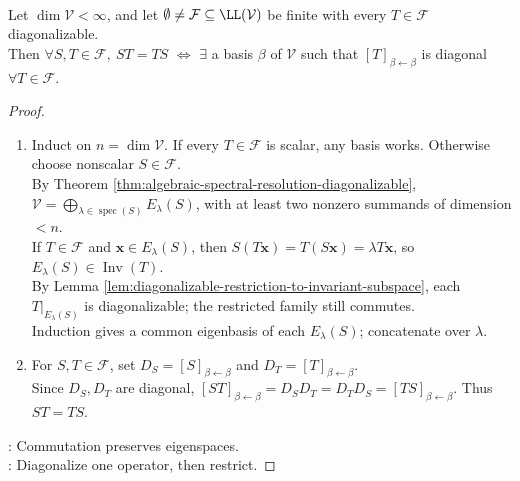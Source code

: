 \begin{theorem} \label{thm:simultaneous-diagonalization-commuting-diagonalizable-family} \\
Let $\dim\mathcal{V}<\infty$, and let $\emptyset\neq\mathcal{F}\subseteq\LL(\mathcal{V})$ be finite with every $T\in\mathcal{F}$ diagonalizable.\\
Then $\forall S,T\in\mathcal{F},\ ST=TS$ $\Longleftrightarrow$ $\exists$ a basis $\beta$ of $\mathcal{V}$ such that $[T]_{\beta\leftarrow\beta}$ is diagonal $\forall T\in\mathcal{F}$.
\begin{proof}
\begin{enumerate}[label=\roman*.]
\setlength{\itemsep}{0pt}
\item[$(\Rightarrow)$] Induct on $n=\dim\mathcal{V}$. If every $T\in\mathcal{F}$ is scalar, any basis works. Otherwise choose nonscalar $S\in\mathcal{F}$.\\
By Theorem \ref{thm:algebraic-spectral-resolution-diagonalizable}, $\mathcal{V}=\bigoplus\limits_{\lambda\in\operatorname{spec}(S)}E_{\lambda}(S)$, with at least two nonzero summands of dimension $<n$.\\
If $T\in\mathcal{F}$ and $\mathbf{x}\in E_{\lambda}(S)$, then $S(T\mathbf{x})=T(S\mathbf{x})=\lambda T\mathbf{x}$, so $E_{\lambda}(S)\in\operatorname{Inv}(T)$.\\
By Lemma \ref{lem:diagonalizable-restriction-to-invariant-subspace}, each $T|_{E_{\lambda}(S)}$ is diagonalizable; the restricted family still commutes.\\
Induction gives a common eigenbasis of each $E_{\lambda}(S)$; concatenate over $\lambda$.
\item[$(\Leftarrow)$] For $S,T\in\mathcal{F}$, set $D_S=[S]_{\beta\leftarrow\beta}$ and $D_T=[T]_{\beta\leftarrow\beta}$.\\
Since $D_S,D_T$ are diagonal, $[ST]_{\beta\leftarrow\beta}=D_SD_T=D_TD_S=[TS]_{\beta\leftarrow\beta}$. Thus $ST=TS$.
\end{enumerate}
: Commutation preserves eigenspaces.\\
: Diagonalize one operator, then restrict.
\end{proof}
\end{theorem}


